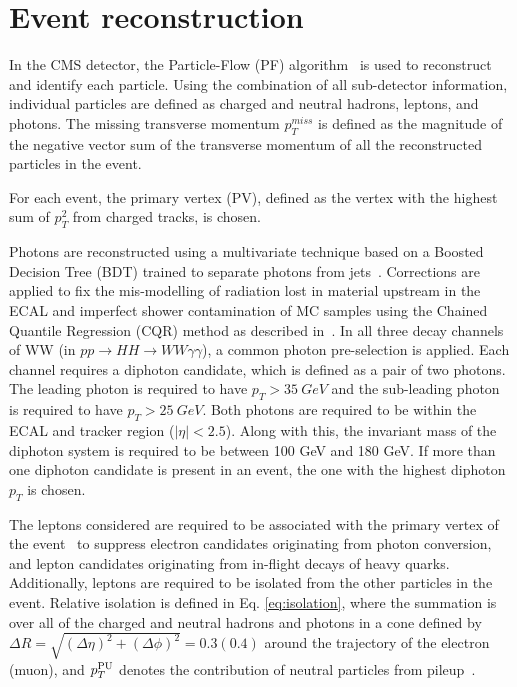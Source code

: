 \section{Event reconstruction}
\label{sec:Objects}

In the CMS detector, the Particle-Flow (PF) algorithm~\cite{Sirunyan:2017ulk} is used to reconstruct and identify each particle.
Using the combination of all sub-detector information, individual particles are defined as charged and neutral hadrons, leptons, and photons.
The missing transverse momentum $p_T^{miss}$ is defined as the magnitude of the negative vector sum of the transverse momentum of all the reconstructed particles in the event.

For each event, the primary vertex (PV), defined as the vertex with the highest sum of $p_{T}^{2}$ from charged tracks, is chosen. 

Photons are reconstructed using a multivariate technique based on a Boosted Decision Tree (BDT) trained to separate photons from jets~\cite{Sirunyan:2018ouh}.
Corrections are applied to fix the mis-modelling of radiation lost in material upstream in the ECAL
and imperfect shower contamination of MC samples using the Chained Quantile Regression (CQR) method as described in~\cite{Khachatryan:2014ira}.
In all three decay channels of WW (in $pp \rightarrow HH \rightarrow WW\gamma\gamma$), a common photon pre-selection is applied.
Each channel requires a diphoton candidate, which is defined as a pair of two photons.
The leading photon is required to have $p_T > 35 ~GeV$ and the sub-leading photon is required to have $p_T > 25 ~GeV$.
Both photons are required to be within the ECAL and tracker region ($|\eta| < 2.5$). Along with this,
the invariant mass of the diphoton system is required to be between 100 GeV and 180 GeV.
If more than one diphoton candidate is present in an event, the one with the highest diphoton $p_T$ is chosen.

The leptons considered are required to be associated with the primary vertex of the event~\cite{Chatrchyan:2014fea}
to suppress electron candidates originating from photon conversion, and lepton candidates originating
from in-flight decays of heavy quarks. Additionally, leptons are required to be isolated from the other particles in the event.
Relative isolation is defined in Eq. \ref{eq:isolation}, where the summation is over all of the charged and neutral hadrons and photons
in a cone defined by $\Delta R = \sqrt{(\Delta \eta)^2 + (\Delta \phi)^2} = 0.3 (0.4)$ around the trajectory of the electron (muon), 
and $p_T^{\textnormal{PU}}$ denotes the contribution of neutral particles from pileup~\cite{Khachatryan:2015hwa,Sirunyan:2018fpa}.
 
